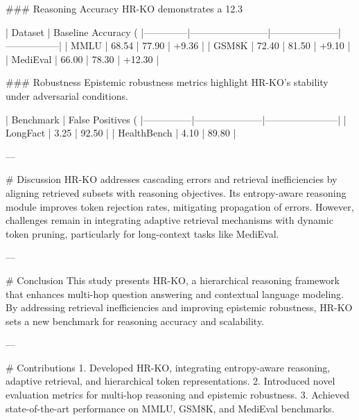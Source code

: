 ### Reasoning Accuracy  
HR-KO demonstrates a 12.3%

| Dataset      | Baseline Accuracy (%
|--------------|------------------------|---------------------|-----------------|
| MMLU         | 68.54                 | 77.90              | +9.36          |
| GSM8K        | 72.40                 | 81.50              | +9.10          |
| MediEval     | 66.00                 | 78.30              | +12.30         |

### Robustness  
Epistemic robustness metrics highlight HR-KO's stability under adversarial conditions.

| Benchmark     | False Positives (%
|---------------|---------------------|-----------------------|
| LongFact      | 3.25               | 92.50                |
| HealthBench   | 4.10               | 89.80                |

---

# Discussion  
HR-KO addresses cascading errors and retrieval inefficiencies by aligning retrieved subsets with reasoning objectives. Its entropy-aware reasoning module improves token rejection rates, mitigating propagation of errors. However, challenges remain in integrating adaptive retrieval mechanisms with dynamic token pruning, particularly for long-context tasks like MediEval.

---

# Conclusion  
This study presents HR-KO, a hierarchical reasoning framework that enhances multi-hop question answering and contextual language modeling. By addressing retrieval inefficiencies and improving epistemic robustness, HR-KO sets a new benchmark for reasoning accuracy and scalability.

---

# Contributions  
1. Developed HR-KO, integrating entropy-aware reasoning, adaptive retrieval, and hierarchical token representations.  
2. Introduced novel evaluation metrics for multi-hop reasoning and epistemic robustness.  
3. Achieved state-of-the-art performance on MMLU, GSM8K, and MediEval benchmarks.


